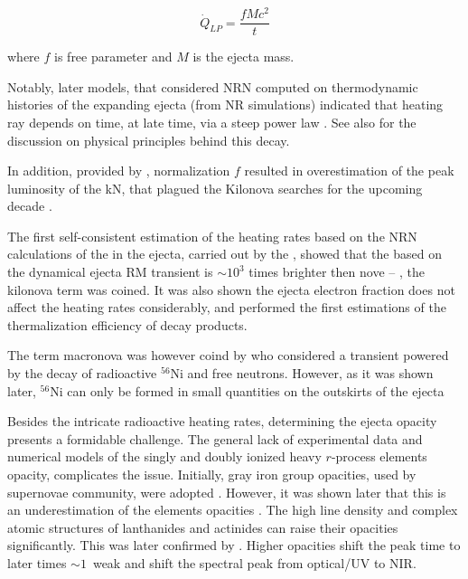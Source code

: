 \begin{equation}
\dot{Q}_{LP} = \frac{f M c^2}{t}
\end{equation}

where $f$ is free parameter and $M$ is the ejecta mass.

Notably, later models, that considered \ac{NRN} computed on thermodynamic histories of the expanding ejecta (from \ac{NR} simulations) indicated that heating ray depends on time, at late time, via a steep power law \citep{Metzger:2010,Roberts:2011,Korobkin:2012uy}. See also \citet{Hotokezaka:2017dbk}
for the discussion on physical principles behind this decay.

In addition, provided by \citet{Li:1998bw}, normalization $f$ resulted in overestimation of the peak luminosity of the \ac{kN}, that plagued the Kilonova searches for the upcoming decade \cite{Rosswog:2005su,Dong:2015oea,Bloom:2005qx,Kocevski:2009gv}. 

The first self-consistent estimation of the heating rates based on the \ac{NRN} calculations of the \rproc{} in the ejecta, carried out by the \citet{Metzger:2010}, showed that the based on the dynamical ejecta \ac{RM} transient is $\sim10^3$ times brighter then nove -- \ie, the kilonova term was coined. It was also shown the ejecta electron fraction does not affect the heating rates considerably, and performed the first estimations of the thermalization efficiency of decay products. 

The term macronova was however coind by \citet{Kulkarni:2005jw} who considered a transient powered by the decay of radioactive $^{56}$Ni and free neutrons. However, as it was shown later, $^{56}$Ni can only be formed in small quantities on the outskirts of the ejecta

Besides the intricate radioactive heating rates, determining the ejecta opacity presents a formidable challenge. 
The general lack of experimental data and numerical models of the singly and doubly ionized heavy $r$-process elements opacity, complicates the issue. Initially, gray iron group opacities, used by supernovae community, were adopted \citep{Roberts:2011}. However, it was shown later that this is an underestimation of the \rproc{} elements opacities \citep{Kasen:2013xka}. The high line density and complex atomic structures of lanthanides and actinides can raise their opacities significantly. This was later confirmed by \citep{Tanaka:2013ana} . Higher opacities shift the peak time to later times ${\sim}1$~weak \citep{Barnes:2013wka} and shift the spectral peak from optical/UV to \ac{NIR}.


